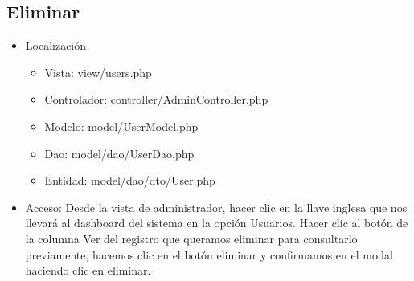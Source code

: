 \subsection{Eliminar} 
\begin{itemize}
\item Localizaci\'{o}n
\begin{itemize}
\item Vista: view/users.php
\item Controlador: controller/AdminController.php
\item Modelo: model/UserModel.php
\item Dao: model/dao/UserDao.php
\item Entidad: model/dao/dto/User.php
\end{itemize}
\item Acceso: Desde la vista de administrador, hacer clic en la llave inglesa que nos llevar\'{a} al dashboard del sistema en la opci\'{o}n Usuarios. Hacer clic al bot\'{o}n de la columna Ver del registro que queramos eliminar para consultarlo previamente, hacemos clic en el bot\'{o}n eliminar y confirmamos en el modal haciendo clic en eliminar.
\end{itemize}

